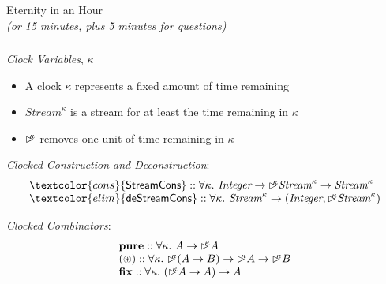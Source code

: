\documentclass[xetex,serif,mathserif]{beamer}
\newcommand{\delay}[1]{\mathord{\rhd\kern-0.4em^{#1}}}
\newenvironment{slide}[1]{\begin{frame}\frametitle{#1}}{\end{frame}}
\newcommand{\cons}[1]{\textcolor{cons}{\textsf{#1}}}
\newcommand{\elim}[1]{\textcolor{elim}{\textsf{#1}}}
\newcommand{\kw}[1]{\textbf{#1}}
\newcommand{\tyname}[1]{\textit{#1}}
\begin{document}
\begin{frame}
  \begin{center}
    {Eternity in an Hour} \\
    \pause
    \textcolor{black!60}{\emph{(or 15 minutes, plus 5 minutes for questions)}}
  \end{center}
\end{frame}


\begin{slide}{}
  \textcolor{titlered}{\emph{Clock Variables}}, $\kappa$ \\
  \begin{itemize}
  \item A clock $\kappa$ represents a fixed amount of time remaining
  \item $\tyname{Stream}^\kappa$ is a stream for at least the time remaining in $\kappa$
  \item $\delay\kappa$ removes one unit of time remaining in $\kappa$
  \end{itemize}
  
  \bigskip
  \pause

  \textcolor{titlered}{\emph{Clocked Construction and Deconstruction}}: \\
  \begin{displaymath}
    \begin{array}{l}
      \cons{StreamCons} :: \forall \kappa.\ \tyname{Integer} \to \delay\kappa \tyname{Stream}^\kappa \to \tyname{Stream}^\kappa \\
      \elim{deStreamCons} :: \forall \kappa.\ \tyname{Stream}^\kappa \to (\tyname{Integer}, \delay\kappa\tyname{Stream}^\kappa)    
    \end{array}
  \end{displaymath}

  \bigskip
  \pause

  \textcolor{titlered}{\emph{Clocked Combinators}}: \\
  \begin{displaymath}
    \begin{array}{l}
      \kw{pure} :: \forall \kappa.\ A \to \delay\kappa A \\
      \kw{$(\circledast)$} :: \forall \kappa.\ \delay\kappa (A \to B) \to \delay\kappa A \to \delay\kappa B \\
      \kw{fix} :: \forall \kappa.\ (\delay\kappa A \to A) \to A
    \end{array}
  \end{displaymath}

\end{slide}
\end{document}
